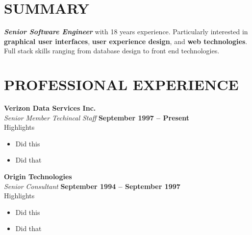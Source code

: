 \documentclass[margin,line]{resume}
\begin{document}
\begin{resume}

    \vspace{-3mm}

    \section{\mysidestyle \textbf{\large{S}\small{UMMARY}}}

    \textbf{\textsl{Senior Software Engineer}} with 18 years experience.  Particularly interested in \textbf{graphical user interfaces}, \textbf{user experience design}, and \textbf{web technologies}.  Full stack skills ranging from database design to front end technologies.

    \vspace{-1mm}

\sectionline

    \section{\mysidestyle \textbf{\large{P}\small{ROFESSIONAL} \large{E}\small{XPERIENCE}}}

    \textbf{\listing Verizon Data Services Inc.} \vspace{2mm}\\\vspace{1mm}%
    \textsl{Senior Member Techincal Staff} \hfill \textbf{September 1997 -- Present}\\
    \textsf{\textmd{Highlights}}\\
    \begin{itemize}
      \item Did this
      \item Did that
    \end{itemize}

    \textbf{\listing Origin Technologies} \vspace{2mm}\\\vspace{1mm}%
    \textsl{Senior Consultant} \hfill \textbf{September 1994 -- September 1997}\\
    \textsf{\textmd{Highlights}}\\
    \begin{itemize}
      \item Did this
      \item Did that
    \end{itemize}


\end{resume}
\end{document}
